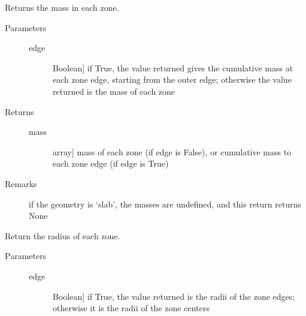 \documentclass[letterpaper,10pt,english]{sphinxmanual}
\begin{document}
\begin{fulllineitems}
\begin{fulllineitems}
\end{fulllineitems}


\begin{fulllineitems}
\label{fulldoc:despotic.zonedcloud.mass}
Returns the mass in each zone.
\begin{description}
\item[{Parameters}] \leavevmode\begin{description}
\item[{edge}] \leavevmode{[}Boolean{]}
if True, the value returned gives the cumulative mass at
each zone edge, starting from the outer edge; otherwise
the value returned is the mass of each zone

\end{description}

\item[{Returns}] \leavevmode\begin{description}
\item[{mass}] \leavevmode{[}array{]}
mass of each zone (if edge is False), or cumulative mass
to each zone edge (if edge is True)

\end{description}

\item[{Remarks}] \leavevmode
if the geometry is `slab', the masses are undefined, and
this return returns None

\end{description}

\end{fulllineitems}


\begin{fulllineitems}
\label{fulldoc:despotic.zonedcloud.radius}
Return the radius of each zone.
\begin{description}
\item[{Parameters}] \leavevmode\begin{description}
\item[{edge}] \leavevmode{[}Boolean{]}
if True, the value returned is the radii of the zone
edges; otherwise it is the radii of the zone centers

\end{description}


\end{description}
\end{fulllineitems}
\end{fulllineitems}
\end{document}
